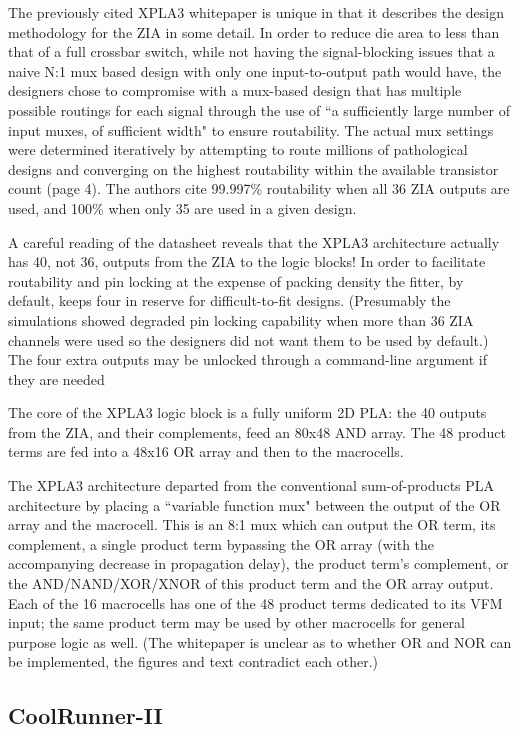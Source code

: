 \documentclass[pdftex,letterpaper]{article}
\begin{document}
The previously cited XPLA3 whitepaper is unique in that it describes the design methodology for the ZIA in some 
detail. In order to reduce die area to less than that of a full crossbar switch, while not having the 
signal-blocking issues that a naive N:1 mux based design with only one input-to-output path would have, the 
designers chose to compromise with a mux-based design that has multiple possible routings for each signal through 
the use of ``a sufficiently large number of input muxes, of sufficient width" to ensure routability. The actual mux 
settings were determined iteratively by attempting to route millions of pathological designs and converging on the 
highest routability within the available transistor count (page 4). The authors cite 99.997\% routability when all 36 
ZIA outputs are used, and 100\% when only 35 are used in a given design.

A careful reading of the datasheet reveals that the XPLA3 architecture actually has 40, not 36, outputs from the ZIA 
to the logic blocks! In order to facilitate routability and pin locking at the expense of packing density the 
fitter, by default, keeps four in reserve for difficult-to-fit designs. (Presumably the simulations showed degraded 
pin locking capability when more than 36 ZIA channels were used so the designers did not want them to be used by 
default.) The four extra outputs may be unlocked through a command-line argument if they are needed

The core of the XPLA3 logic block is a fully uniform 2D PLA: the 40 outputs from the ZIA, and their complements, 
feed an 80x48 AND array. The 48 product terms are fed into a 48x16 OR array and then to the macrocells.

The XPLA3 architecture departed from the conventional sum-of-products PLA architecture by placing a ``variable function 
mux" between the output of the OR array and the macrocell. This is an 8:1 mux which can output the OR term, its 
complement, a single product term bypassing the OR array (with the accompanying decrease in propagation delay), the 
product term's complement, or the AND/NAND/XOR/XNOR of this product term and the OR array output. Each of the 16 
macrocells has one of the 48 product terms dedicated to its VFM input; the same product term may be used by other 
macrocells for general purpose logic as well. (The whitepaper is unclear as to whether OR and NOR can be implemented, 
the figures and text contradict each other.)

\subsection{CoolRunner-II}
\end{document}
